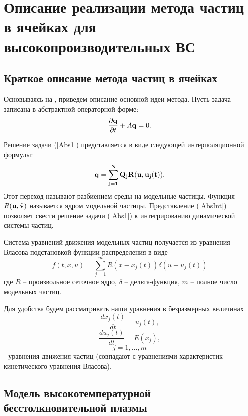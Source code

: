\chapter{Описание реализации метода частиц в ячейках для высокопроизводительных ВС}
\label{chapt1}

\section{Краткое описание метода частиц в ячейках}


Основываясь на
\cite{VshivkovPICbook}, приведем описание основной идеи метода. Пусть задача записана 
в абстрактной операторной форме:
\begin{equation}
\label{Abs1}
\frac{\partial {\bf q}}{\partial t} + A{\bf q} = 0.
\end{equation}

Решение задачи (\ref{Abs1}) представляется в виде следующей интерполяционной 
формулы:
\begin{equation}
\label{AbsInt}
\bf{q} = \sum\limits^{N}_{j=1}\bf{Q}_j R(\bf{u},\bf{u}_j(t)).
\end{equation}
Этот переход называют разбиением среды на модельные частицы. Функция 
$R(\bf{u},\vec{v})$ называется ядром модельной частицы. Представление
(\ref{AbsInt}) позволяет свести решение задачи 
(\ref{Abs1}) к интегрированию динамической системы частиц.


\quad Система уравнений движения модельных частиц получается
\cite{Grig} из уравнения Власова подстановкой функции
распределения в виде
\begin{equation}\label{fr}
f(t,x,u)=\sum_{j=1}^m R(x-x_j(t))\delta(u-u_j(t))
\end{equation}
где $R$ -- произвольное сеточное ядро,  %
$\delta$ -- дельта-функция, $m$ -- полное число модельных частиц.

Для удобства будем рассматривать наши уравнения в безразмерных
величинах
\begin{equation}\label{dx}
\frac{dx_j(t)}{dt}=u_j(t),
\end{equation}
\begin{equation}\label{du}
\frac{du_j(t)}{dt}=E(x_j),
\end{equation}
\begin{displaymath}
j=1,\ldots, m
\end{displaymath}
- уравнения движения частиц (совпадают с уравнениями характеристик
кинетического уравнения Власова).

\section{Модель высокотемпературной бесстолкновительной плазмы}

